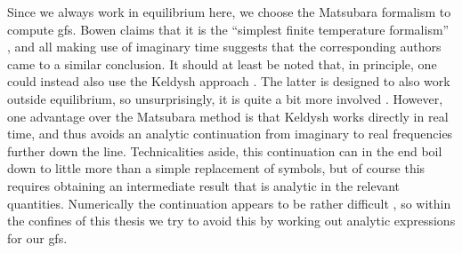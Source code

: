 Since we always work in equilibrium here, we choose the Matsubara formalism to compute \glspl{gf}.
Bowen claims that it is the ``simplest finite temperature formalism'' \cite[]{Bosonization_FiniteT_Bowen_2001}, and \cite{Giamarchi_2004,Gogolin_1999,Fradkin_2013,QMB_Fabrizio_2022,Bosonization_TLL_Schonhammer_1997,Bosonization_GF_LL_Meden_1999,Bosonization_Rao_2001,Bosonization_LowE_1d_fluids_Haldane_1981} all making use of imaginary time suggests that the corresponding authors came to a similar conclusion.
It should at least be noted that, in principle, one could instead also use the Keldysh approach \cite[]{AltlandSimons}.
The latter is designed to also work outside equilibrium, so unsurprisingly, it is quite a bit more involved \cite{GF_intro_InOutEquil_Ge_2023}.
However, one advantage over the Matsubara method is that Keldysh works directly in real time, and thus avoids an analytic continuation from imaginary to real frequencies further down the line.
Technicalities aside, this continuation can in the end boil down to little more than a simple replacement of symbols, but of course this requires obtaining an intermediate result that is analytic in the relevant quantities.
Numerically the continuation appears to be rather difficult \cite{NumericAnalyticCont_QMC_MaxEntropy_Gubernatis_1991,NumericAnalyticCont_ImagTimeData_Burnier_2011}, so within the confines of this thesis we try to avoid this by working out analytic expressions for our \glspl{gf}.
